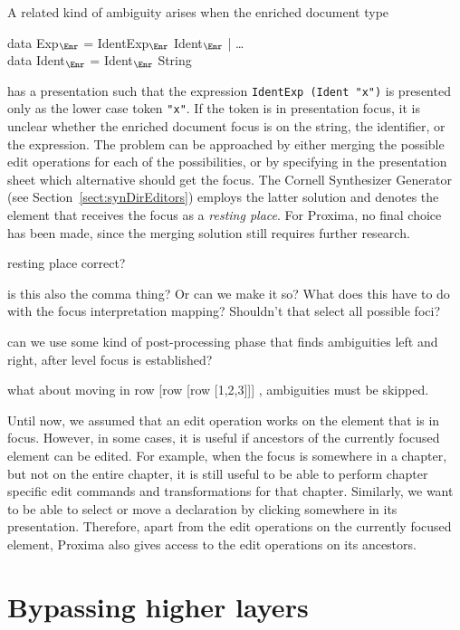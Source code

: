 A related kind of ambiguity arises when the enriched document type

\small \ttfamily
\begin{tabbing}
data Exp$_{\Enr}$ = IdentExp$_{\Enr}$ Ident$_{\Enr}$ | \dots \\
data Ident$_{\Enr}$ = Ident$_{\Enr}$ String
\end{tabbing}
\rmfamily \normalsize

has a presentation such that the expression \verb|IdentExp (Ident "x")| is presented only as the lower case token \verb|"x"|. If the token is in presentation focus, it is unclear whether the enriched document focus is on the string, the identifier, or the expression. The problem can be approached by either merging the possible edit operations for each of the possibilities, or by specifying in the presentation sheet which alternative should get the focus. The Cornell Synthesizer Generator (see Section~\ref{sect:synDirEditors}) employs the latter solution and denotes the element that receives the focus as a {\em resting place}. For Proxima, no final choice has been made, since the merging solution still requires further research. 

\bc
resting place correct?

is this also the comma thing? Or can we make it so?
What does this have to do with the focus interpretation mapping? Shouldn't that select all possible foci?

can we use some kind of post-processing phase that finds ambiguities left and right, after level focus is established?

what about moving in row [row [row [1,2,3]]] , ambiguities must be skipped. 
\ec

Until now, we assumed that an edit operation works on the element that is in focus. However, in some cases, it is useful if ancestors of the currently focused element can be edited. For example, when the focus is somewhere in a chapter, but not on the entire chapter, it is still useful to be able to perform chapter specific edit commands and transformations for that chapter. Similarly, we want to be able to select or move a declaration by clicking somewhere in its presentation. Therefore, apart from the edit operations on the currently focused element, Proxima also gives access to the edit operations on its ancestors. 


%																
%																
%																
\section{Bypassing higher layers} \label{sect:bypassingLayers}

